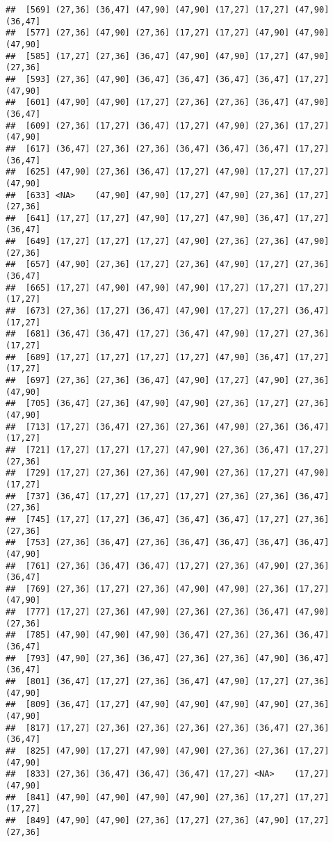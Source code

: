 \documentclass[12pt,]{article}
\begin{document}
\begin{verbatim}
##  [569] (27,36] (36,47] (47,90] (47,90] (17,27] (17,27] (47,90] (36,47]
##  [577] (27,36] (47,90] (27,36] (17,27] (17,27] (47,90] (47,90] (47,90]
##  [585] (17,27] (27,36] (36,47] (47,90] (47,90] (17,27] (47,90] (27,36]
##  [593] (27,36] (47,90] (36,47] (36,47] (36,47] (36,47] (17,27] (47,90]
##  [601] (47,90] (47,90] (17,27] (27,36] (27,36] (36,47] (47,90] (36,47]
##  [609] (27,36] (17,27] (36,47] (17,27] (47,90] (27,36] (17,27] (47,90]
##  [617] (36,47] (27,36] (27,36] (36,47] (36,47] (36,47] (17,27] (36,47]
##  [625] (47,90] (27,36] (36,47] (17,27] (47,90] (17,27] (17,27] (47,90]
##  [633] <NA>    (47,90] (47,90] (17,27] (47,90] (27,36] (17,27] (27,36]
##  [641] (17,27] (17,27] (47,90] (17,27] (47,90] (36,47] (17,27] (36,47]
##  [649] (17,27] (17,27] (17,27] (47,90] (27,36] (27,36] (47,90] (27,36]
##  [657] (47,90] (27,36] (17,27] (27,36] (47,90] (17,27] (27,36] (36,47]
##  [665] (17,27] (47,90] (47,90] (47,90] (17,27] (17,27] (17,27] (17,27]
##  [673] (27,36] (17,27] (36,47] (47,90] (17,27] (17,27] (36,47] (17,27]
##  [681] (36,47] (36,47] (17,27] (36,47] (47,90] (17,27] (27,36] (17,27]
##  [689] (17,27] (17,27] (17,27] (17,27] (47,90] (36,47] (17,27] (17,27]
##  [697] (27,36] (27,36] (36,47] (47,90] (17,27] (47,90] (27,36] (47,90]
##  [705] (36,47] (27,36] (47,90] (47,90] (27,36] (17,27] (27,36] (47,90]
##  [713] (17,27] (36,47] (27,36] (27,36] (47,90] (27,36] (36,47] (17,27]
##  [721] (17,27] (17,27] (17,27] (47,90] (27,36] (36,47] (17,27] (27,36]
##  [729] (17,27] (27,36] (27,36] (47,90] (27,36] (17,27] (47,90] (17,27]
##  [737] (36,47] (17,27] (17,27] (17,27] (27,36] (27,36] (36,47] (27,36]
##  [745] (17,27] (17,27] (36,47] (36,47] (36,47] (17,27] (27,36] (27,36]
##  [753] (27,36] (36,47] (27,36] (36,47] (36,47] (36,47] (36,47] (47,90]
##  [761] (27,36] (36,47] (36,47] (17,27] (27,36] (47,90] (27,36] (36,47]
##  [769] (27,36] (17,27] (27,36] (47,90] (47,90] (27,36] (17,27] (47,90]
##  [777] (17,27] (27,36] (47,90] (27,36] (27,36] (36,47] (47,90] (27,36]
##  [785] (47,90] (47,90] (47,90] (36,47] (27,36] (27,36] (36,47] (36,47]
##  [793] (47,90] (27,36] (36,47] (27,36] (27,36] (47,90] (36,47] (36,47]
##  [801] (36,47] (17,27] (27,36] (36,47] (47,90] (17,27] (27,36] (47,90]
##  [809] (36,47] (17,27] (47,90] (47,90] (47,90] (47,90] (27,36] (47,90]
##  [817] (17,27] (27,36] (27,36] (27,36] (27,36] (36,47] (27,36] (36,47]
##  [825] (47,90] (17,27] (47,90] (47,90] (27,36] (27,36] (17,27] (47,90]
##  [833] (27,36] (36,47] (36,47] (36,47] (17,27] <NA>    (17,27] (47,90]
##  [841] (47,90] (47,90] (47,90] (47,90] (27,36] (17,27] (17,27] (17,27]
##  [849] (47,90] (47,90] (27,36] (17,27] (27,36] (47,90] (17,27] (27,36]

\end{verbatim}
\end{document}
